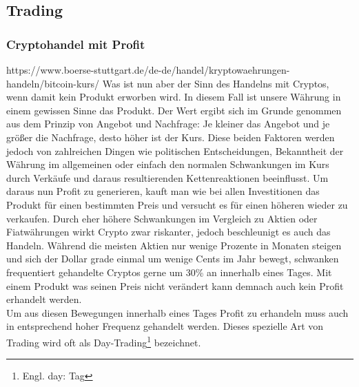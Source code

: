 \documentclass[12pt]{article}
\begin{document}
\subsection{Trading}
	\subsubsection{Cryptohandel mit Profit}
		https://www.boerse-stuttgart.de/de-de/handel/kryptowaehrungen-handeln/bitcoin-kurs/
		Was ist nun aber der Sinn des Handelns mit Cryptos, wenn damit kein Produkt erworben wird. In diesem Fall ist unsere Währung in einem gewissen Sinne das Produkt. Der Wert ergibt sich im Grunde genommen aus dem Prinzip von Angebot und Nachfrage: Je kleiner das Angebot und je größer die Nachfrage, desto höher ist der Kurs. Diese beiden Faktoren werden jedoch von zahlreichen Dingen wie politischen Entscheidungen, Bekanntheit der Währung im allgemeinen oder einfach den normalen Schwankungen im Kurs durch Verkäufe und daraus resultierenden Kettenreaktionen beeinflusst. Um daraus nun Profit zu generieren, kauft man wie bei allen Investitionen das Produkt für einen bestimmten Preis und versucht es für einen höheren wieder zu verkaufen. Durch eher höhere Schwankungen im Vergleich zu Aktien oder Fiatwährungen wirkt Crypto zwar riskanter, jedoch beschleunigt es auch das Handeln. Während die meisten Aktien nur wenige Prozente in Monaten steigen und sich der Dollar grade einmal um wenige Cents im Jahr bewegt, schwanken frequentiert gehandelte Cryptos gerne um 30\% an innerhalb eines Tages. Mit einem Produkt was seinen Preis nicht verändert kann demnach auch kein Profit erhandelt werden.\\
		Um aus diesen Bewegungen innerhalb eines Tages Profit zu erhandeln muss auch in entsprechend hoher Frequenz gehandelt werden. Dieses spezielle Art von Trading wird oft als Day-Trading\footnote{Engl. day: Tag} bezeichnet.	
\end{document}
